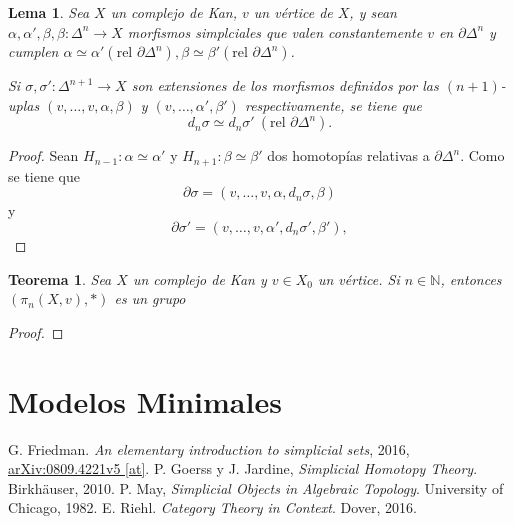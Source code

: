 \documentclass[11pt]{report}
\theoremstyle{colored}
\newtheorem{theorem}{Teorema}[section]
\newtheorem{lemma}{Lema}[section]
\newcommand{\N}{\mathbb{N}}
\renewcommand{\ss}[1]{\Delta^{#1}}
\begin{document}
\begin{lemma} Sea $X$ un complejo de Kan, $v$ un vértice de $X$, y sean $\alpha,\alpha',\beta,\beta : \ss{n} \to X$ morfismos simplciales que valen constantemente $v$ en $\partial \ss{n}$ y cumplen $\alpha \simeq \alpha' (\text{rel $\partial \ss{n}$}), \beta \simeq \beta' (\text{rel $\partial \ss{n}$})$. 

Si $\sigma, \sigma' : \ss{n+1} \to X$ son extensiones de los morfismos definidos por las $(n+1)$-uplas $(v,\dots,v,\alpha,\beta)$ y $(v,\dots,\alpha',\beta')$ respectivamente, se tiene que
\[
d_n\sigma \simeq d_n\sigma' \ (\text{rel $\partial \ss{n}$}).
\] 
\end{lemma}
\begin{proof} Sean $H_{n-1} : \alpha \simeq \alpha'$ y $H_{n+1} : \beta \simeq \beta'$ dos homotopías relativas a $\partial \ss{n}$. Como se tiene que
\[
\partial \sigma = (v,\dots,v,\alpha,d_n\sigma,\beta)
\]
y
\[
\partial \sigma' = (v,\dots,v,\alpha',d_n\sigma',\beta'),
\]
\end{proof}

\begin{theorem} Sea $X$ un complejo de Kan y $v \in X_0$ un vértice. Si $n \in \N$, entonces $(\pi_n(X,v),\ast)$ es un grupo
\end{theorem}
\begin{proof}
\end{proof}


\section{Modelos Minimales}

\begin{thebibliography}{}
 G. Friedman. \textit{An elementary introduction to simplicial sets}, 2016, \href{https://arxiv.org/abs/0809.4221}{arXiv:0809.4221v5 [at]}.
 P. Goerss y J. Jardine, \textit{Simplicial Homotopy Theory}. Birkhäuser, 2010.
 P. May, \textit{Simplicial Objects in Algebraic Topology}. University of Chicago, 1982. 
 E. Riehl. \textit{Category Theory in Context}. Dover, 2016.
\end{thebibliography}
\end{document}
